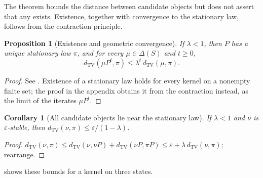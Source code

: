 \documentclass[11pt]{article}
\newtheorem{proposition}{Proposition}[section]
\newtheorem{corollary}{Corollary}[section]
\theoremstyle{definition}
\newcommand{\1}{\mathbf{1}}
\newcommand{\dTV}{d_{\mathrm{TV}}}
\begin{document}
The theorem bounds the distance between candidate objects but does not assert that any exists.
Existence, together with convergence to the stationary law, follows from the contraction principle.

\begin{proposition}[Existence and geometric convergence]\label{lem:objecthood_unique_fixed}
If $\lambda<1$, then $P$ has a unique stationary law $\pi$, and for every $\mu\in\Delta(S)$ and $t\ge 0$,
\[
  \dTV(\mu P^t,\pi)\le\lambda^t\,\dTV(\mu,\pi).
\]
\end{proposition}

\begin{proof}
See . Existence of a stationary law holds for every kernel on a nonempty finite set; the proof in the appendix obtains it from the contraction instead, as the limit of the iterates $\mu P^t$.
\end{proof}

\begin{corollary}[All candidate objects lie near the stationary law]\label{cor:eps_ball}
If $\lambda<1$ and $\nu$ is $\varepsilon$-stable, then $\dTV(\nu,\pi)\le\varepsilon/(1-\lambda)$.
\end{corollary}

\begin{proof}
$\dTV(\nu,\pi)\le\dTV(\nu,\nu P)+\dTV(\nu P,\pi P)\le\varepsilon+\lambda\,\dTV(\nu,\pi)$; rearrange.
\end{proof}

 shows these bounds for a kernel on three states.
\end{document}
